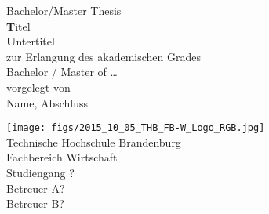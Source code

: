 \begin{titlepage}
\begin{center}

\vspace*{20mm}
{\normalsize Bachelor/Master Thesis}\\[2mm]
{\large \textbf Titel\\[2mm]\small \textbf Untertitel}
\\[5mm]

zur Erlangung des akademischen Grades\\
Bachelor / Master of \ldots\\
vorgelegt von\\
\large Name, Abschluss

\vspace*{12mm}
\small


\vspace*{10mm}
\texttt{[image: figs/2015\_10\_05\_THB\_FB-W\_Logo\_RGB.jpg]}\\
\small 
Technische Hochschule Brandenburg\\
Fachbereich Wirtschaft\\
Studiengang ?\\
Betreuer A?\\
Betreuer B?

\end{center}
\end{titlepage}